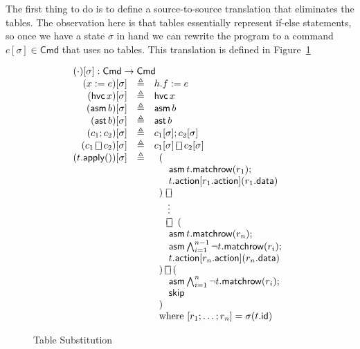 \documentclass{article}
\newcommand{\Cmd}{\mathsf{Cmd}}
\newcommand{\action}{\mathsf{action}}
\newcommand{\data}{\mathsf{data}}
\newcommand{\id}{\mathsf{id}}
\newcommand{\assert}{\mathop{\mathsf{ast}}}
\newcommand{\assume}{\mathop{\mathsf{asm}}}
\newcommand{\apply}{\mathsf{apply}}
\newcommand{\choiceop}{\rotatebox[origin=c]{90}{$\sqsubset\!\!\!\sqsupset$}}
\newcommand{\choice}{\mathbin{\choiceop}}
\newcommand{\havoc}[1]{\mathop{\mathsf{hvc}}#1}
\newcommand{\SKIP}{\mathsf{skip}}
\newcommand{\matchrow}{\mathsf{matchrow}}
\theoremstyle{plain}
\theoremstyle{definition}
\theoremstyle{remark}
\begin{document}
The first thing to do is to define a source-to-source translation that
eliminates the tables. The observation here is that tables essentially represent
if-else statements, so once we have a state $\sigma$ in hand we can rewrite the
program to a command $c[\sigma] \in \Cmd$ that uses no tables. This translation
is defined in Figure~\ref{fig:table-elim}

\begin{figure}
  \[\begin{array}{r>{\triangleq}cl}
  \multicolumn{3}{l}{(\cdot)[\sigma] : \Cmd \to \Cmd} \\
  (x := e)[\sigma] && h.f := e \\
  (\havoc x)[\sigma] && \havoc x \\
  (\assume b)[\sigma] && \assume b \\
  (\assert b)[\sigma] && \assert b \\
  (c_1;c_2)[\sigma] && c_1[\sigma];c_2[\sigma] \\
  (c_1 \choice c_2)[\sigma] && c_1[\sigma] \choice c_2[\sigma] \\
  (t.\apply())[\sigma] &&
  \begin{array}[t]{l}
    (\\
    \quad \assume {t.\matchrow(r_1)};\\
    \quad t.\action[r_1.\action](r_1.\data)\\
    )~\choice\\
    \phantom)~\,\vdots\\
    \phantom)\,\choice~(\\
    \quad \assume {t.\matchrow(r_n)};\\
    \quad \assume {\bigwedge_{i=1}^{n-1}{\neg t.\matchrow(r_i)}};\\
    \quad t.\action[r_n.\action](r_n.\data)\\
    )\choice (\\
    \quad \assume {\bigwedge_{i=1}^n \neg t.\matchrow(r_i)};\\
    \quad \SKIP \\
    )\\
    \textrm{where}~[r_1;\ldots;r_n] = \sigma(t.\id)
  \end{array}
  \end{array}
  \]
  \caption{Table Substitution}
  \label{fig:table-elim}
\end{figure}
\end{document}

